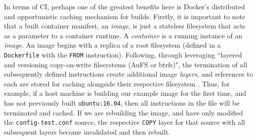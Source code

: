 \documentclass{report}
\begin{document}
\par
In terms of CI, perhaps one of the greatest benefits here is 
Docker's distributed and opportunistic caching mechanism for builds.
Firstly, it is important to note that a built container manifest, an \textit{image}, is just a stateless filesystem that acts
as a parameter to a container runtime. A \textit{container} is a running instance of an \textit{image}.
An image begins with a replica of a root filesystem (defined in a \texttt{Dockerfile} with the \texttt{FROM} instruction).
Following, through leveraging ``layered and versioning
copy-on-write filesystems (AuFS or btrfs)", the termination of
all subsequently defined instructions create additional image \textit{layers}, and references to each are
stored for caching alongside their respective filesystem \citep{Arndt}. Thus, for example,
if a host machine is building our example image for the first time, and has not previously
built  \texttt{ubuntu:16.04}, then all instructions in the file will be terminated and cached.
If we are rebuilding the image, and have only modified the \texttt{config-test.conf} source, 
the respective \texttt{COPY} layer for that source with all subsequent layers become invalidated and then rebuilt.
\end{document}
